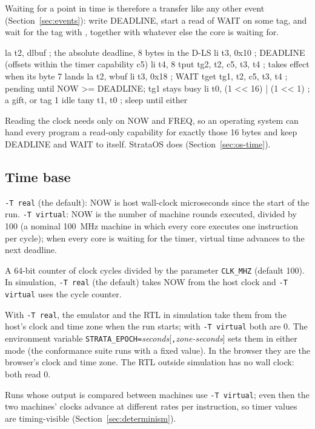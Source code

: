 Waiting for a point in time is therefore a transfer like any other event
(Section~\ref{sec:events}): write DEADLINE, start a read of WAIT on some tag, and wait for the tag with
, together with whatever else the core is waiting for.

\begin{asm}
        la    t2, dlbuf                 ; the absolute deadline, 8 bytes in the D-LS
        li    t3, 0x10                  ; DEADLINE (offsets within the timer capability c5)
        li    t4, 8
        tput  tg2, t2, c5, t3, t4       ; takes effect when its byte 7 lands
        la    t2, wbuf
        li    t3, 0x18                  ; WAIT
        tget  tg1, t2, c5, t3, t4       ; pending until NOW >= DEADLINE; tg1 stays busy
        li    t0, (1 << 16) | (1 << 1)  ; a gift, or tag 1 idle
        tany  t1, t0                    ; sleep until either
\end{asm}

Reading the clock needs only  on NOW and FREQ, so an operating system can hand every program
a read-only capability for exactly those 16 bytes and keep DEADLINE and WAIT to itself. StrataOS does
(Section~\ref{sec:os-time}).

\subsection{Time base}
\begin{description}[leftmargin=1em,style=nextline]
\item[Emulator] \texttt{-T real} (the default): NOW is host wall-clock microseconds since the start of
  the run. \texttt{-T virtual}: NOW is the number of machine rounds executed, divided by 100 (a nominal
  100~MHz machine in which every core executes one instruction per cycle); when every core is waiting
  for the timer, virtual time advances to the next deadline.
\item[RTL] A 64-bit counter of clock cycles divided by the parameter \texttt{CLK\_MHZ} (default 100).
  In simulation, \texttt{-T real} (the default) takes NOW from the host clock and \texttt{-T virtual}
  uses the cycle counter.
\item[EPOCH and ZONE] With \texttt{-T real}, the emulator and the RTL in simulation take them from the
  host's clock and time zone when the run starts; with \texttt{-T virtual} both are 0. The environment
  variable \texttt{STRATA\_EPOCH=}\textit{seconds}[\texttt{,}\textit{zone-seconds}] sets them in
  either mode (the conformance suite runs with a fixed value). In the browser they are the browser's
  clock and time zone. The RTL outside simulation has no wall clock: both read 0.
\end{description}
Runs whose output is compared between machines use \texttt{-T virtual}; even then the two machines'
clocks advance at different rates per instruction, so timer values are timing-visible
(Section~\ref{sec:determinism}).

